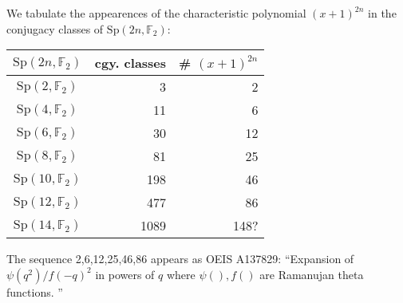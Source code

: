 \documentclass[11pt,oneside]{article}
\newcommand{\Sp}{\mathrm{Sp}}
\newcommand{\Field}{\mathbb{F}}
\begin{document}
%
%

We tabulate the appearences of the characteristic polynomial 
$(x+1)^{2n}$ in the conjugacy classes of $\Sp(2n,\Field_2)$:
\begin{center}\begin{tabular}{c|r|r}
$\Sp(2n,\Field_2)$ & cgy. classes  & \# $(x+1)^{2n}$ \\
\hline
$\Sp(2,\Field_2)$   & 3     & 2 \\
$\Sp(4,\Field_2)$   & 11    & 6 \\
$\Sp(6,\Field_2)$   & 30    & 12 \\
$\Sp(8,\Field_2)$   & 81    & 25 \\
$\Sp(10,\Field_2)$  & 198   & 46 \\
$\Sp(12,\Field_2)$  & 477   & 86 \\
$\Sp(14,\Field_2)$  & 1089  & 148? \\
\end{tabular} \end{center}
The sequence 2,6,12,25,46,86 appears as OEIS A137829:
``Expansion of $\psi(q^2) / f(-q)^2$ in powers of $q$ where
$\psi(), f()$ are Ramanujan theta functions. 
''


{}

\end{document}
